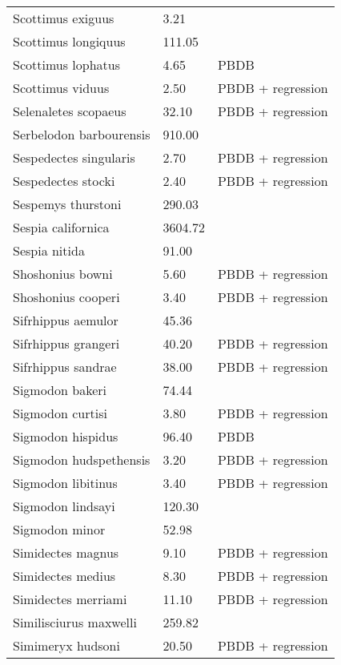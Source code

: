 \begin{longtable}{p{} p{} p{}}
    Scottimus exiguus & 3.21 & \cite{Novacek1977} \\ 
    Scottimus longiquus & 111.05 & \cite{Tomiya2013} \\ 
    Scottimus lophatus & 4.65 & PBDB \\ 
    Scottimus viduus & 2.50 & PBDB + regression \\ 
    Selenaletes scopaeus & 32.10 & PBDB + regression \\ 
    Serbelodon barbourensis & 910.00 & \cite{Secord2008a} \\ 
    Sespedectes singularis & 2.70 & PBDB + regression \\ 
    Sespedectes stocki & 2.40 & PBDB + regression \\ 
    Sespemys thurstoni & 290.03 & \cite{Tomiya2013} \\ 
    Sespia californica & 3604.72 & \cite{Tomiya2013} \\ 
    Sespia nitida & 91.00 & \cite{VanValkenburgh2007a} \\ 
    Shoshonius bowni & 5.60 & PBDB + regression \\ 
    Shoshonius cooperi & 3.40 & PBDB + regression \\ 
    Sifrhippus aemulor & 45.36 & \cite{Osborn1933} \\ 
    Sifrhippus grangeri & 40.20 & PBDB + regression \\ 
    Sifrhippus sandrae & 38.00 & PBDB + regression \\ 
    Sigmodon bakeri & 74.44 & \cite{Tomiya2013} \\ 
    Sigmodon curtisi & 3.80 & PBDB + regression \\ 
    Sigmodon hispidus & 96.40 & PBDB \\ 
    Sigmodon hudspethensis & 3.20 & PBDB + regression \\ 
    Sigmodon libitinus & 3.40 & PBDB + regression \\ 
    Sigmodon lindsayi & 120.30 & \cite{Tomiya2013} \\ 
    Sigmodon minor & 52.98 & \cite{Tomiya2013} \\ 
    Simidectes magnus & 9.10 & PBDB + regression \\ 
    Simidectes medius & 8.30 & PBDB + regression \\ 
    Simidectes merriami & 11.10 & PBDB + regression \\ 
    Similisciurus maxwelli & 259.82 & \cite{Tomiya2013} \\ 
    Simimeryx hudsoni & 20.50 & PBDB + regression \\ 

\end{longtable}

